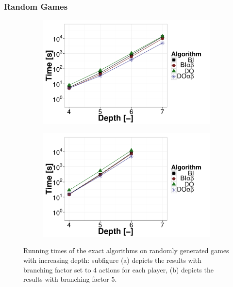 \subsubsection{Random Games}
\begin{figure}[t!]
\centering
	\begin{subfigure}{0.49\textwidth}
		\includegraphics[width=1\textwidth]{figures/RG-BF4-BIN-FALSE.pdf}\caption{}\label{fig:off:res:rgbf4}
	\end{subfigure}
	\begin{subfigure}{0.49\textwidth}
		\includegraphics[width=1\textwidth]{figures/RG-BF5-BIN-FALSE.pdf}\caption{}\label{fig:off:res:rgbf5}
	\end{subfigure}
\caption{Running times of the exact algorithms on randomly generated games with increasing depth: subfigure (a) depicts the results with branching factor set to $4$ actions for each player, (b) depicts the results with branching factor $5$.} \label{fig:off:res:rg}
\end{figure}

